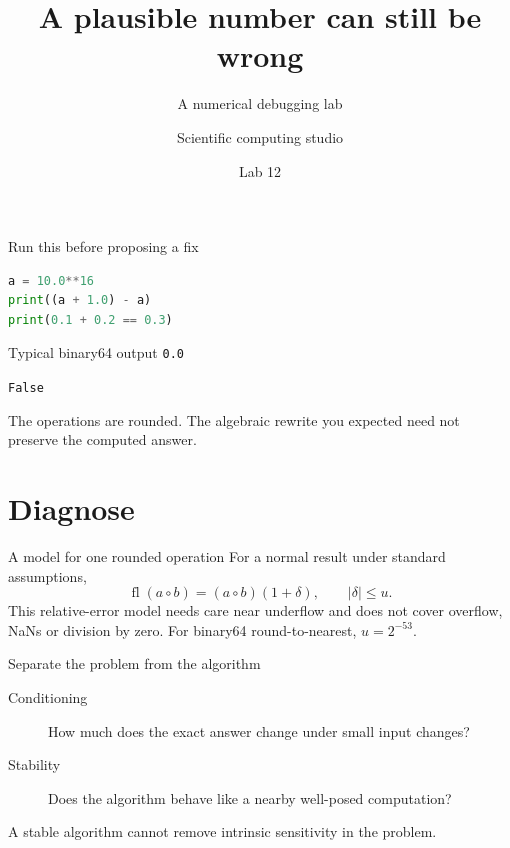 \documentclass[14pt,aspectratio=1610]{beamer}
\title{A plausible number can still be wrong}
\subtitle{A numerical debugging lab}
\author{Scientific computing studio}
\date{Lab 12}
\begin{document}
\begin{frame}[plain]\titlepage\end{frame}
\begin{frame}[fragile]{Run this before proposing a fix}
\begin{lstlisting}[language=Python]
a = 10.0**16
print((a + 1.0) - a)
print(0.1 + 0.2 == 0.3)
\end{lstlisting}
\pause
\begin{block}{Typical binary64 output}
\texttt{0.0}\par\texttt{False}
\end{block}
The operations are rounded. The algebraic rewrite you expected need not preserve the computed answer.
\end{frame}
\section{Diagnose}
\begin{frame}{A model for one rounded operation}
For a normal result under standard assumptions,
\[
 \operatorname{fl}(a\circ b)=(a\circ b)(1+\delta),
 \qquad |\delta|\leq u.
\]
\small This relative-error model needs care near underflow and does not cover overflow, NaNs or division by zero. For binary64 round-to-nearest, $u=2^{-53}$.
\end{frame}
\begin{frame}{Separate the problem from the algorithm}
\begin{description}
\item[Conditioning] How much does the exact answer change under small input changes?
\item[Stability] Does the algorithm behave like a nearby well-posed computation?
\end{description}
\pause
\alert{A stable algorithm cannot remove intrinsic sensitivity in the problem.}
\end{frame}
\end{document}
